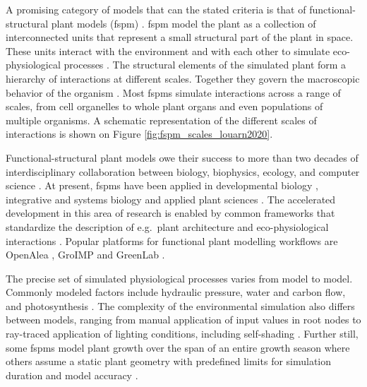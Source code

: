 
A promising category of models that can the stated criteria is that of functional-structural plant models (\acrshort{fspm}) \citep{godin_functionalstructural_2005, louarn_two_2020}.
\acrshort{fspm} model the plant as a collection of interconnected units that represent a small structural part of the plant in space.
These units interact with the environment and with each other to simulate eco-physiological processes \citep{coussement_turgor-driven_2020}. 
The structural elements of the simulated plant form a hierarchy of interactions at different scales. Together they govern the macroscopic behavior of the organism \citep{louarn_two_2020}. Most \acrshort{fspm}s simulate interactions across a range of scales, from cell organelles to whole plant organs and even populations of multiple organisms. A schematic representation of the different scales of interactions is shown on Figure \ref{fig:fspm_scales_louarn2020}.





Functional-structural plant models owe their success to more than two decades of interdisciplinary collaboration between biology, biophysics, ecology, and computer science \citep{louarn_two_2020}.
At present, \acrshort{fspm}s have been applied in developmental biology \citep{cieslak_integrating_2016, schneider_light_2019, gauthier_functional_2020}, integrative and systems biology \citep{zhu_plants_2016, chang_systems_2019, millar_practical_2019} and applied plant sciences \citep{renton_modelling_2017, albasha_hydroshoot_2019, university_of_reading_uk_advances_2021}. 
The accelerated development in this area of research is enabled by common frameworks that standardize the description of e.g.\ plant architecture \citep{godin_multiscale_1998, boudon_l-py_2012} and eco-physiological interactions \citep{fournier_caribu_2016, zhou_cplantbox_2020}. 
Popular platforms for functional plant modelling workflows are OpenAlea \citep{pradal_openalea_2008, pradal_openalea_2015}, GroIMP \citep{vos_groimp_2007} and GreenLab \citep{de_reffye_two_2021}. 


The precise set of simulated physiological processes varies from model to model. 
Commonly modeled factors include hydraulic pressure, water and carbon flow, and photosynthesis \citep{coussement_turgor-driven_2020, zhou_cplantbox_2020, albasha_hydroshoot_2019}. 
The complexity of the environmental simulation also differs between models, ranging from manual application of input values in root nodes \citep{zhou_cplantbox_2020} to ray-traced application of lighting conditions, including self-shading \citep{coussement_turgor-driven_2020}.
Further still, some \acrshort{fspm}s model plant growth over the span of an entire growth season \citep{lecarpentier_walter_2019, coussement_turgor-driven_2020} where others assume a static plant geometry with predefined limits for simulation duration and model accuracy \citep{albasha_hydroshoot_2019}.


